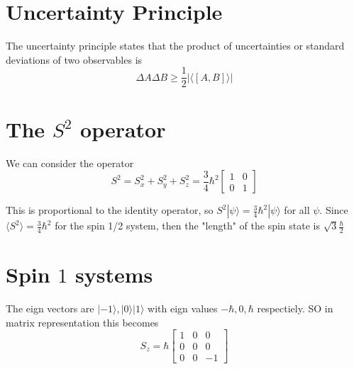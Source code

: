 \documentclass{homework}
\newcommand{\m}[1]{\begin{bmatrix} #1 \end{bmatrix}}
\newcommand{\kt}{\rangle}
\newcommand{\br}{\langle}
\newcommand{\ket}[1]{| #1 \rangle}
\begin{document}
\section{Uncertainty Principle}

The uncertainty principle states that the product of uncertainties or standard deviations of two observables is 
\[\Delta A \Delta B \ge \frac{1}{2}|\br [A,B] \kt|\]


\section{The $S^2$ operator}

We can consider the operator 
\[S^2 = S_x^2 + S_y^2 + S_z^2 = \frac{3}{4}\hbar^2\m{1 & 0 \\ 0 & 1}\]

This is proportional to the identity operator, so $S^2 \ket{\psi} = \frac{3}{4}\hbar^2\ket{\psi}$ for all $\psi$. Since $\langle S^2 \rangle = \frac{3}{4}\hbar^2$ for the spin 1/2 system, then the "length" of the spin state is $\sqrt{3}\frac{\hbar}{2}$

\section{Spin $1$ systems}

The eign vectors are $\ket{-1}, \ket{0} \ket{1}$ with eign values $-\hbar, 0, \hbar$ respectiely. SO in matrix representation this becomes
\[S_z = \hbar \m{1 & 0 & 0 \\ 0 & 0 & 0 \\ 0 & 0 & -1}\]
\end{document}
